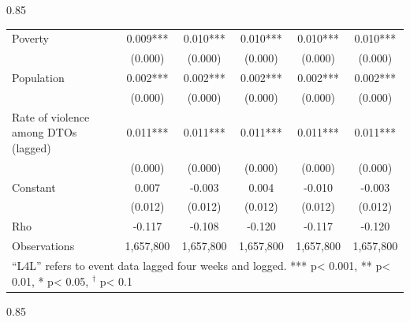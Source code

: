 \documentclass[12pt,letterpaper]{article}
\begin{document}
\begin{landscape}
\begin{center}
\begin{spacing}{0.85}
\begin{longtable}{lccccc}
Poverty & 0.009*** & 0.010*** & 0.010*** & 0.010*** & 0.010***  \\ 
 & (0.000)  & (0.000)  & (0.000)  & (0.000)  & (0.000)   \\ 
Population & 0.002*** & 0.002*** & 0.002*** & 0.002*** & 0.002***  \\ 
 & (0.000)  & (0.000)  & (0.000)  & (0.000)  & (0.000)   \\ 
Rate of violence among DTOs (lagged) & 0.011*** & 0.011*** & 0.011*** & 0.011*** & 0.011***  \\ 
 & (0.000)  & (0.000)  & (0.000)  & (0.000)  & (0.000)   \\ 
Constant & 0.007  & -0.003  & 0.004  & -0.010  & -0.003   \\ 
 & (0.012)  & (0.012)  & (0.012)  & (0.012)  & (0.012)   \\ \hline
                 
Rho & -0.117  & -0.108  & -0.120  & -0.117  & -0.120   \\ 
                 
Observations  &  1,657,800   &  1,657,800   &  1,657,800   &  1,657,800   &  1,657,800    \\ \hline

\multicolumn{6}{l}{``L4L'' refers to event data lagged four weeks and logged.  *** p< 0.001, ** p< 0.01, * p< 0.05, $^{\dag}$ p< 0.1} \\

\end{longtable}
\end{spacing}
\end{center}









\begin{center}
\small
\begin{spacing}{0.85}
\begin{longtable}{lccccc}


\end{longtable}
\end{spacing}
\end{center}
\end{landscape}
\end{document}
